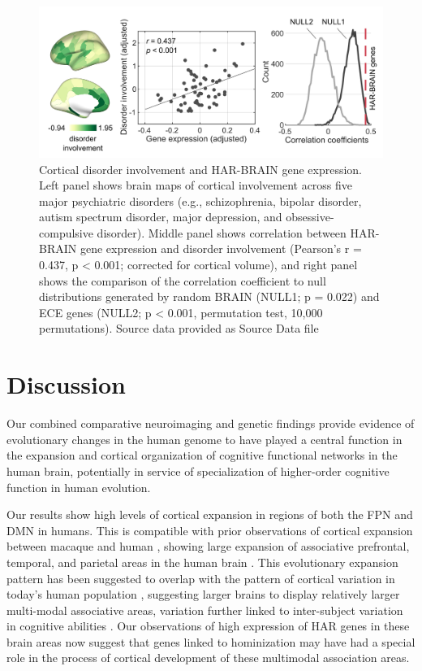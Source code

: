 \begin{refsection}
\begin{figure}[h]
    \centering
    \includegraphics[width=\linewidth]{images/harFig7.png}
    \caption{Cortical disorder involvement and HAR-BRAIN gene expression. Left panel shows brain maps of cortical involvement across five major psychiatric disorders (e.g., schizophrenia, bipolar disorder, autism spectrum disorder, major depression, and obsessive-compulsive disorder). Middle panel shows correlation between HAR-BRAIN gene expression and disorder involvement (Pearson's r = 0.437, p < 0.001; corrected for cortical volume), and right panel shows the comparison of the correlation coefficient to null distributions generated by random BRAIN (NULL1; p = 0.022) and ECE genes (NULL2; p < 0.001, permutation test, 10,000 permutations). Source data provided as Source Data file}
    \label{harFig7}
\end{figure}

\section*{Discussion}
Our combined comparative neuroimaging and genetic findings provide evidence of evolutionary changes in the human genome to have played a central function in the expansion and cortical organization of cognitive functional networks in the human brain, potentially in service of specialization of higher-order cognitive function in human evolution.

Our results show high levels of cortical expansion in regions of both the FPN and DMN in humans. This is compatible with prior observations of cortical expansion between macaque and human \citep{hill2010similar}, showing large expansion of associative prefrontal, temporal, and parietal areas in the human brain \citep{hill2010similar,donahue2018quantitative}. This evolutionary expansion pattern has been suggested to overlap with the pattern of cortical variation in today’s human population \citep{reardon2018normative}, suggesting larger brains to display relatively larger multi-modal associative areas, variation further linked to inter-subject variation in cognitive abilities \citep{Ryu256313}. Our observations of high expression of HAR genes in these brain areas now suggest that genes linked to hominization may have had a special role in the process of cortical development of these multimodal association areas.


\end{refsection}
